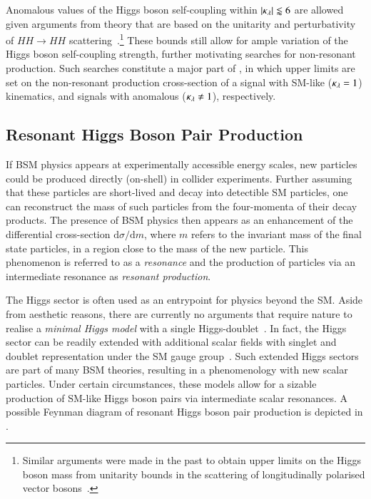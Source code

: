 %
Anomalous values of the Higgs boson self-coupling within
$|\kappa_{\lambda}| \lessapprox 6$ are allowed given arguments from theory that are
based on the unitarity and perturbativity of $HH \to HH$
scattering~\cite{DiLuzio:2017tfn}.\footnote{Similar arguments were made in the
  past to obtain upper limits on the Higgs boson mass from unitarity bounds in
  the scattering of longitudinally polarised vector bosons~\cite{Lee:1977eg}.}
These bounds still allow for ample variation of the Higgs boson self-coupling
strength, further motivating searches for non-resonant \HH production. Such
searches constitute a major part of ,
in which upper limits are set on the non-resonant \HH production cross-section
of a signal with SM-like ($\kappa_{\lambda} = 1$) kinematics, and signals with anomalous
\klambda ($\kappa_{\lambda} \neq 1$), respectively.


\subsection{Resonant Higgs Boson Pair Production}%
\label{sec:bsm_resonant_hh}

If BSM physics appears at experimentally accessible energy scales, new particles
could be produced directly (on-shell) in collider experiments. Further assuming
that these particles are short-lived and decay into detectible SM particles, one
can reconstruct the mass of such particles from the four-momenta of their decay
products. The presence of BSM physics then appears as an enhancement of the
differential cross-section $\mathrm{d}\sigma / \mathrm{d}m$, where $m$ refers to
the invariant mass of the final state particles, in a region close to the mass
of the new particle. This phenomenon is referred to as a \emph{resonance} and
the production of particles via an intermediate resonance as \emph{resonant
  production}.

The Higgs sector is often used as an entrypoint for physics beyond the SM. Aside
from aesthetic reasons, there are currently no arguments that require nature to
realise a \emph{minimal Higgs model} with a single
Higgs-doublet~\cite{Gunion:1989we}. In fact, the Higgs sector can be readily
extended with additional scalar fields with singlet and doublet representation
under the SM gauge group~\cite{Gunion:1989we}. Such extended Higgs sectors are
part of many BSM theories, resulting in a phenomenology with new scalar
particles. Under certain circumstances, these models allow for a sizable
production of SM-like Higgs boson pairs via intermediate scalar resonances. A
possible Feynman diagram of resonant Higgs boson pair production is depicted in
.


